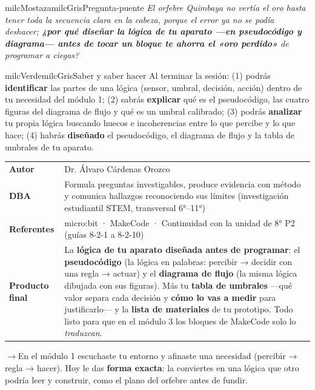 \documentclass[11pt,letterpaper]{article}
\newcommand{\puente}[1]{%
  \begin{puentebox}%
    \textcolor{milcGradeDark}{$\rightarrow$}\hspace{2mm}#1%
  \end{puentebox}%
}
\begin{document}
\begin{softbox}{milcMostaza}{milcGris}{Pregunta-puente}
\textit{El orfebre Quimbaya no vertía el oro hasta tener toda la secuencia clara en la cabeza, porque el error ya no se podía deshacer; \textbf{¿por qué diseñar la lógica de tu aparato ---en pseudocódigo y diagrama--- antes de tocar un bloque te ahorra el «oro perdido»} de programar a ciegas?}
\end{softbox}

\begin{softbox}{milcVerde}{milcGris}{Saber y saber hacer}
Al terminar la sesión: (1) podrás \textbf{identificar} las partes de una lógica (sensor, umbral, decisión, acción) dentro de tu necesidad del módulo 1; (2) sabrás \textbf{explicar} qué es el pseudocódigo, las cuatro figuras del diagrama de flujo y qué es un umbral calibrado; (3) podrás \textbf{analizar} tu propia lógica buscando huecos e incoherencias entre lo que percibe y lo que hace; (4) habrás \textbf{diseñado} el pseudocódigo, el diagrama de flujo y la tabla de umbrales de tu aparato.
\end{softbox}



\small
\begin{tabularx}{\textwidth}{>{\bfseries}p{3.0cm}Y}
Autor & Dr. Álvaro Cárdenas Orozco\\
DBA & Formula preguntas investigables, produce evidencia con método y comunica hallazgos reconociendo sus límites (investigación estudiantil STEM, transversal 6°--11°)\\
Referentes & micro:bit · MakeCode · Continuidad con la unidad de 8° P2 (guías 8-2-1 a 8-2-10)\\
Producto final & La \textbf{lógica de tu aparato diseñada antes de programar}: el \textbf{pseudocódigo} (la lógica en palabras: percibir → decidir con una regla → actuar) y el \textbf{diagrama de flujo} (la misma lógica dibujada con sus figuras). Más tu \textbf{tabla de umbrales} ---qué valor separa cada decisión y \textbf{cómo lo vas a medir} para justificarlo--- y la \textbf{lista de materiales} de tu prototipo. Todo listo para que en el módulo 3 los bloques de MakeCode solo lo \emph{traduzcan}.\\
\end{tabularx}
\normalsize

\puente{En el módulo 1 escuchaste tu entorno y afinaste una necesidad (percibir → regla → hacer). Hoy le das \textbf{forma exacta}: la conviertes en una lógica que otro podría leer y construir, como el plano del orfebre antes de fundir.}
\end{document}
